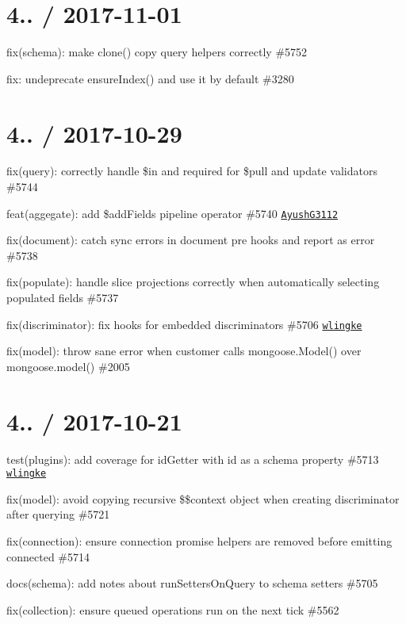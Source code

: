 \section*{4.. / 2017-\/11-\/01 }


\begin{DoxyItemize}
\item fix(schema)\+: make clone() copy query helpers correctly \#5752
\item fix\+: undeprecate {\ttfamily ensure\+Index()} and use it by default \#3280
\end{DoxyItemize}

\section*{4.. / 2017-\/10-\/29 }


\begin{DoxyItemize}
\item fix(query)\+: correctly handle {\ttfamily \$in} and required for \$pull and update validators \#5744
\item feat(aggegate)\+: add \$add\+Fields pipeline operator \#5740 \href{https://github.com/AyushG3112}{\tt Ayush\+G3112}
\item fix(document)\+: catch sync errors in document pre hooks and report as error \#5738
\item fix(populate)\+: handle slice projections correctly when automatically selecting populated fields \#5737
\item fix(discriminator)\+: fix hooks for embedded discriminators \#5706 \href{https://github.com/wlingke}{\tt wlingke}
\item fix(model)\+: throw sane error when customer calls {\ttfamily mongoose.\+Model()} over {\ttfamily mongoose.\+model()} \#2005
\end{DoxyItemize}

\section*{4.. / 2017-\/10-\/21 }


\begin{DoxyItemize}
\item test(plugins)\+: add coverage for id\+Getter with id as a schema property \#5713 \href{https://github.com/wlingke}{\tt wlingke}
\item fix(model)\+: avoid copying recursive \$\$context object when creating discriminator after querying \#5721
\item fix(connection)\+: ensure connection promise helpers are removed before emitting \textquotesingle{}connected\textquotesingle{} \#5714
\item docs(schema)\+: add notes about run\+Setters\+On\+Query to schema setters \#5705
\item fix(collection)\+: ensure queued operations run on the next tick \#5562
\end{DoxyItemize}

